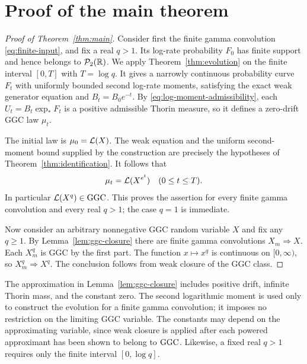 \section{Proof of the main theorem}
\label{sec:completion}

\begin{proof}[Proof of Theorem~\ref{thm:main}]
Consider first the finite gamma convolution \eqref{eq:finite-input}, and fix a real $q>1$.
Its log-rate probability $F_0$ has finite support and hence belongs to $\mathcal P_2(\mathbb R)$.
We apply Theorem~\ref{thm:evolution} on the finite interval $[0,T]$ with $T=\log q$.
It gives a narrowly continuous probability curve $F_t$ with uniformly bounded second log-rate moments, satisfying the exact weak generator equation and $B_t=B_0e^{-t}$.
By \eqref{eq:log-moment-admissibility}, each $U_t=B_t\exp_*F_t$ is a positive admissible Thorin measure, so it defines a zero-drift GGC law $\mu_t$.

The initial law is $\mu_0=\mathcal L(X)$.
The weak equation and the uniform second-moment bound supplied by the construction are precisely the hypotheses of Theorem~\ref{thm:identification}.
It follows that
\[
 \mu_t=\mathcal L(X^{e^t})\quad(0\leq t\leq T).
\]
In particular $\mathcal L(X^q)\in\operatorname{GGC}$.
This proves the assertion for every finite gamma convolution and every real $q>1$; the case $q=1$ is immediate.

Now consider an arbitrary nonnegative GGC random variable $X$ and fix any $q\geq1$.
By Lemma~\ref{lem:ggc-closure} there are finite gamma convolutions $X_m\Rightarrow X$.
Each $X_m^q$ is GGC by the first part.
The function $x\mapsto x^q$ is continuous on $[0,\infty)$, so $X_m^q\Rightarrow X^q$.
The conclusion follows from weak closure of the GGC class.
\end{proof}

\begin{remark}
The approximation in Lemma~\ref{lem:ggc-closure} includes positive drift, infinite Thorin mass, and the constant zero.
The second logarithmic moment is used only to construct the evolution for a finite gamma convolution; it imposes no restriction on the limiting GGC variable.
The constants may depend on the approximating variable, since weak closure is applied after each powered approximant has been shown to belong to $\operatorname{GGC}$.
Likewise, a fixed real $q>1$ requires only the finite interval $[0,\log q]$.
\end{remark}
